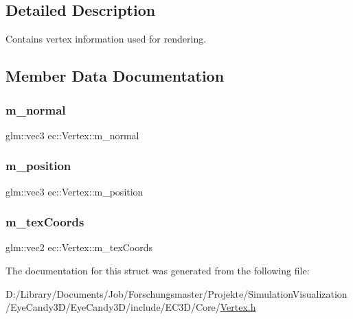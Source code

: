 \subsection{Detailed Description}
Contains vertex information used for rendering. 

\subsection{Member Data Documentation}
\mbox{\label{structec_1_1_vertex_aec5eb9b7fc72c250525c6b64bfabd2a2}} 
\subsubsection{\texorpdfstring{m\+\_\+normal}{m\_normal}}
{\footnotesize\ttfamily glm\+::vec3 ec\+::\+Vertex\+::m\+\_\+normal}

\mbox{\label{structec_1_1_vertex_acb3327c996406e4d1a6b43cfa1f3ea47}} 
\subsubsection{\texorpdfstring{m\+\_\+position}{m\_position}}
{\footnotesize\ttfamily glm\+::vec3 ec\+::\+Vertex\+::m\+\_\+position}

\mbox{\label{structec_1_1_vertex_a12e2b45d0fdb3873a01dd9ada9e66f64}} 
\subsubsection{\texorpdfstring{m\+\_\+tex\+Coords}{m\_texCoords}}
{\footnotesize\ttfamily glm\+::vec2 ec\+::\+Vertex\+::m\+\_\+tex\+Coords}



The documentation for this struct was generated from the following file\+:\begin{DoxyCompactItemize}
\item 
D\+:/\+Library/\+Documents/\+Job/\+Forschungsmaster/\+Projekte/\+Simulation\+Visualization/\+Eye\+Candy3\+D/\+Eye\+Candy3\+D/include/\+E\+C3\+D/\+Core/\mbox{\hyperlink{_vertex_8h}{Vertex.\+h}}\end{DoxyCompactItemize}
